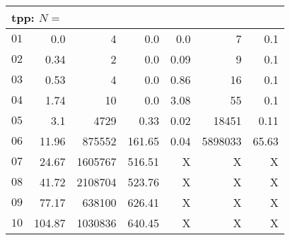 \begin{longtable}{|c||r|r|r||r|r|r|}
\multicolumn{7}{|l|}{tpp: $N=$}\\\hline
$01$ & 0.0 & 4 & 0.0 & 0.0 & 7 & 0.1 \\\hline
$02$ & 0.34 & 2 & 0.0 & 0.09 & 9 & 0.1 \\\hline
$03$ & 0.53 & 4 & 0.0 & 0.86 & 16 & 0.1 \\\hline
$04$ & 1.74 & 10 & 0.0 & 3.08 & 55 & 0.1 \\\hline
$05$ & 3.1 & 4729 & 0.33 & 0.02 & 18451 & 0.11 \\\hline
$06$ & 11.96 & 875552 & 161.65 & 0.04 & 5898033 & 65.63 \\\hline
$07$ & 24.67 & 1605767 & 516.51 & X & X & X \\\hline
$08$ & 41.72 & 2108704 & 523.76 & X & X & X \\\hline
$09$ & 77.17 & 638100 & 626.41 & X & X & X \\\hline
$10$ & 104.87 & 1030836 & 640.45 & X & X & X \\\hline

\end{longtable}